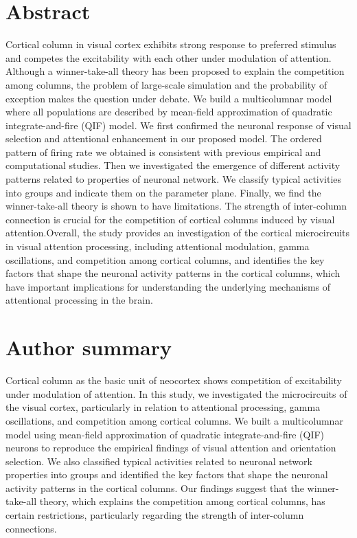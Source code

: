 \documentclass[10pt,letterpaper]{article}
\begin{document}
\section*{Abstract}
Cortical column in visual cortex exhibits strong response to preferred stimulus and competes the excitability with each other under modulation of attention. Although a winner-take-all theory has been proposed to explain the competition among columns, the problem of large-scale simulation and the probability of exception makes the question under debate. We build a multicolumnar model where all populations are described by mean-field approximation of quadratic integrate-and-fire (QIF) model. We first confirmed the neuronal response of visual selection and attentional enhancement in our proposed model. The ordered pattern of firing rate we obtained is consistent with previous empirical and computational studies. Then we investigated the emergence of different activity patterns related to properties of neuronal network. We classify typical activities into groups and indicate them on the parameter plane. Finally, we find the winner-take-all theory is shown to have limitations. The strength of inter-column connection is crucial for the competition of cortical columns induced by visual attention.Overall, the study provides an investigation of the cortical microcircuits in visual attention processing, including attentional modulation, gamma oscillations, and competition among cortical columns, and identifies the key factors that shape the neuronal activity patterns in the cortical columns, which have important implications for understanding the underlying mechanisms of attentional processing in the brain.

\section*{Author summary}
Cortical column as the basic unit of neocortex shows competition of excitability under modulation of attention. 
In this study, we investigated the microcircuits of the visual cortex, particularly in relation to attentional processing, gamma oscillations, and competition among cortical columns. 
 We built a multicolumnar model using mean-field approximation of quadratic integrate-and-fire (QIF) neurons to reproduce the empirical findings of visual attention and orientation selection. We also classified typical activities related to neuronal network properties into groups and identified the key factors that shape the neuronal activity patterns in the cortical columns. Our findings suggest that the winner-take-all theory, which explains the competition among cortical columns, has certain restrictions, particularly regarding the strength of inter-column connections. 
\end{document}
